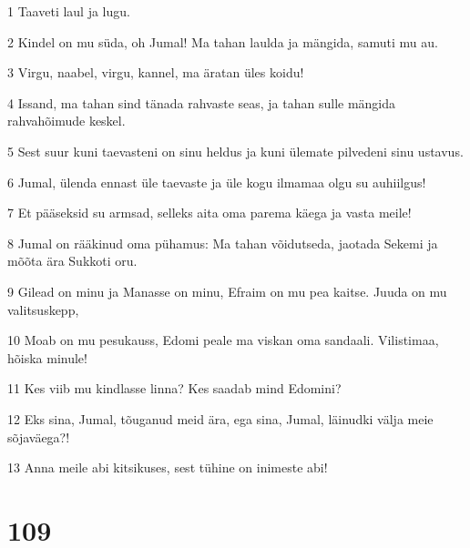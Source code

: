 \par 1 Taaveti laul ja lugu.
\par 2 Kindel on mu süda, oh Jumal! Ma tahan laulda ja mängida, samuti mu au.
\par 3 Virgu, naabel, virgu, kannel, ma äratan üles koidu!
\par 4 Issand, ma tahan sind tänada rahvaste seas, ja tahan sulle mängida rahvahõimude keskel.
\par 5 Sest suur kuni taevasteni on sinu heldus ja kuni ülemate pilvedeni sinu ustavus.
\par 6 Jumal, ülenda ennast üle taevaste ja üle kogu ilmamaa olgu su auhiilgus!
\par 7 Et pääseksid su armsad, selleks aita oma parema käega ja vasta meile!
\par 8 Jumal on rääkinud oma pühamus: Ma tahan võidutseda, jaotada Sekemi ja mõõta ära Sukkoti oru.
\par 9 Gilead on minu ja Manasse on minu, Efraim on mu pea kaitse. Juuda on mu valitsuskepp,
\par 10 Moab on mu pesukauss, Edomi peale ma viskan oma sandaali. Vilistimaa, hõiska minule!
\par 11 Kes viib mu kindlasse linna? Kes saadab mind Edomini?
\par 12 Eks sina, Jumal, tõuganud meid ära, ega sina, Jumal, läinudki välja meie sõjaväega?!
\par 13 Anna meile abi kitsikuses, sest tühine on inimeste abi!

\chapter{109}


